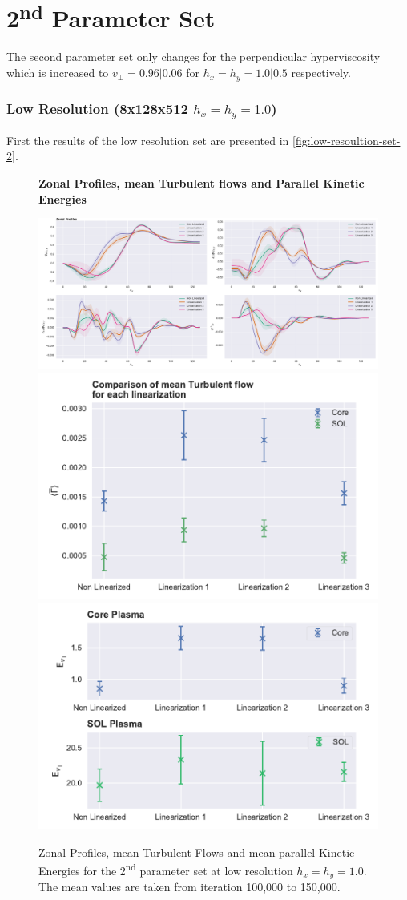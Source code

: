 \documentclass[master.tex]{subfiles}
\begin{document}
\section{2\textsuperscript{nd} Parameter Set}
The second parameter set only changes for the perpendicular hyperviscosity which is increased to $v_\perp = 0.96 | 0.06$ for $h_x=h_y=1.0|0.5$ respectively.

\subsubsection{Low Resolution (8x128x512 $h_x=h_y=1.0$)}

First the results of the low resolution set are presented in \autoref{fig:low-resoultion-set-2}.

\begin{figure}[!hbtp]
    \textbf{Zonal Profiles, mean Turbulent flows and Parallel Kinetic Energies}\par\medskip
    \includegraphics[width=\linewidth]{pdfs/0-2_0-96/zonal_profiles_100000.pdf}
    \includegraphics[width=0.5\linewidth]{pdfs/0-2_0-96/turbulent_flow_means_100000.pdf}
    \includegraphics[width=0.5\linewidth]{pdfs/0-2_0-96/parallelvelocity_mean_100000.pdf}
    \caption{Zonal Profiles, mean Turbulent Flows and mean parallel Kinetic Energies for the 2\textsuperscript{nd} parameter set at low resolution $h_x = h_y = 1.0$. The mean values are taken from iteration 100,000 to 150,000.}
    \label{fig:low-resoultion-set-2}
\end{figure}
\end{document}
